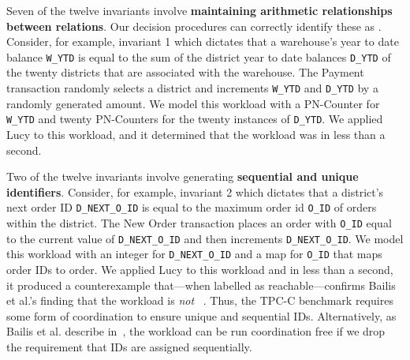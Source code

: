     \newcommand{\ttt}[1]{{\smaller \texttt{#1}}} Seven of the twelve invariants
    involve \textbf{maintaining arithmetic relationships between relations}.
    Our decision procedures can correctly identify these as
    \invariantconfluent{}. Consider, for example, invariant 1 which dictates
    that a warehouse's year to date balance \ttt{W\_YTD} is equal to the sum of
    the district year to date balances \ttt{D\_YTD} of the twenty districts
    that are associated with the warehouse. The Payment transaction randomly
    selects a district and increments \ttt{W\_YTD} and \ttt{D\_YTD} by a
    randomly generated amount. We model this workload with a PN-Counter for
    \ttt{W\_YTD} and twenty PN-Counters for the twenty instances of
    \ttt{D\_YTD}. We applied Lucy to this workload, and it determined that the
    workload was \invariantconfluent{} in less than a second.

    Two of the twelve invariants involve generating \textbf{sequential and
    unique identifiers}. Consider, for example, invariant 2 which dictates that
    a district's next order ID \ttt{D\_NEXT\_O\_ID} is equal to the maximum
    order id \ttt{O\_ID} of orders within the district. The New Order
    transaction places an order with \ttt{O\_ID} equal to the current value of
    \ttt{D\_NEXT\_O\_ID} and then increments \ttt{D\_NEXT\_O\_ID}.
    We model this workload with an integer for \ttt{D\_NEXT\_O\_ID} and a map
    for \ttt{O\_ID} that maps order IDs to order.
    We applied Lucy to this workload and in less than a second, it produced a
    counterexample that---when labelled as reachable---confirms Bailis et al.'s
    finding that the workload is \emph{not}
    \invariantconfluent{}~\cite{bailis2014coordination}. Thus, the TPC-C
    benchmark requires some form of coordination to ensure unique and
    sequential IDs. Alternatively, as Bailis et al. describe
    in~\cite{bailis2014coordination}, the workload can be run coordination free
    if we drop the requirement that IDs are assigned sequentially.

